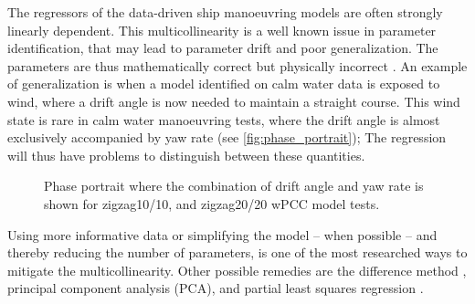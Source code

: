 
%
The regressors of the data-driven ship manoeuvring models are often strongly linearly dependent. This multicollinearity is a well known issue in parameter identification, that may lead to parameter drift and poor generalization. The parameters are thus mathematically correct but physically incorrect \citep{luo_parameter_2016}. 
An example of generalization is when a model identified on calm water data is exposed to wind, where a drift angle is now needed to maintain a straight course. This wind state is rare in calm water manoeuvring tests, where the drift angle is almost exclusively accompanied by yaw rate (see \autoref{fig:phase_portrait}); 
The regression will thus have problems to distinguish between these quantities.
%
\begin{figure}[h]
  \centering
  
  \caption{Phase portrait where the combination of drift angle and yaw rate is shown for zigzag10/10, and zigzag20/20 wPCC model tests.}
  \label{fig:phase_portrait}
\end{figure}
Using more informative data or simplifying the model -- when possible -- and thereby reducing the number of parameters, is one of the most researched ways to mitigate the multicollinearity. Other possible remedies are the difference method \citep{luo_parameter_2016}, principal component analysis (PCA), and partial least squares regression \citep{jian-chuan_parametric_2015}. 

